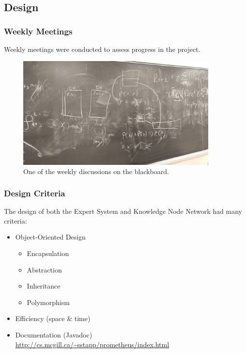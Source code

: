 \documentclass{beamer}
\begin{document}
	\subsection{Design}
	
	\begin{frame}
		\frametitle{Weekly Meetings}
		Weekly meetings were conducted to assess progress in the project.
		\begin{figure}
			\centering
			\includegraphics[width=0.9\textwidth]{figures/meeting.jpg}
			\caption
			{One of the weekly discussions on the blackboard.}
			\label{fig:meeting}
		\end{figure}
	\end{frame}
	
	\begin{frame}
		\frametitle{Design Criteria}
		The design of both the Expert System and Knowledge Node Network had many criteria:
		\begin{itemize}
			\item Object-Oriented Design
					\begin{itemize}
						\item Encapsulation
						\item Abstraction
						\item Inheritance
						\item Polymorphism
					\end{itemize}
			\item Efficiency (space \& time)
			\item Documentation (Javadoc) \url{http://cs.mcgill.ca/~sstapp/prometheus/index.html}
		\end{itemize}
	\end{frame}
\end{document}
